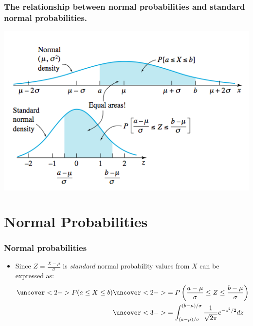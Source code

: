 \documentclass[handout]{beamer}\usepackage[]{graphicx}\usepackage[]{color}
\numberwithin{equation}{section}
\begin{document}
\begin{frame}
\frametitle{\small The relationship between normal probabilities and standard normal probabilities.}
 \includegraphics{../../fig/np3.png}
\end{frame}

\section{Normal Probabilities}

\begin{frame}
\frametitle{Normal probabilities}
\begin{itemize}
\item Since $Z = \frac{X - \mu}{\sigma}$ is \emph{standard} normal probability values from $X$ can be expressed as:
\begin{align*}
\uncover<2->{ P(a \le X \le b)} & \uncover<2->{ = P \left ( \frac{a-\mu}{\sigma} \le Z \le \frac{b - \mu}{\sigma} \right )} \\
&\uncover<3->{ = \int_{(a-\mu)/\sigma}^{(b-\mu)/\sigma} \frac{1}{\sqrt{2 \pi}} e^{-z^2/2} dz}
\end{align*}
\begin{itemize}
\end{itemize}
\end{itemize}
\end{frame}
\end{document}
